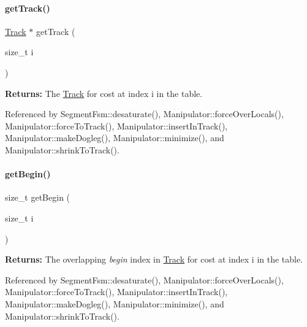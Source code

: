 \paragraph{\texorpdfstring{get\+Track()}{getTrack()}}
{\footnotesize\ttfamily \mbox{\hyperlink{classKite_1_1Track}{Track}} $\ast$ get\+Track (\begin{DoxyParamCaption}\item[{size\+\_\+t}]{i }\end{DoxyParamCaption})\hspace{0.3cm}{\ttfamily [inline]}}

{\bfseries Returns\+:} The \mbox{\hyperlink{classKite_1_1Track}{Track}} for cost at index {\ttfamily i} in the table. 

Referenced by Segment\+Fsm\+::desaturate(), Manipulator\+::force\+Over\+Locals(), Manipulator\+::force\+To\+Track(), Manipulator\+::insert\+In\+Track(), Manipulator\+::make\+Dogleg(), Manipulator\+::minimize(), and Manipulator\+::shrink\+To\+Track().

\mbox{\label{classKite_1_1SegmentFsm_a13a1ec8bdcf29f2bcb21cab348b77ed2}} 
\paragraph{\texorpdfstring{get\+Begin()}{getBegin()}}
{\footnotesize\ttfamily size\+\_\+t get\+Begin (\begin{DoxyParamCaption}\item[{size\+\_\+t}]{i }\end{DoxyParamCaption})\hspace{0.3cm}{\ttfamily [inline]}}

{\bfseries Returns\+:} The overlapping {\itshape begin} index in \mbox{\hyperlink{classKite_1_1Track}{Track}} for cost at index {\ttfamily i} in the table. 

Referenced by Segment\+Fsm\+::desaturate(), Manipulator\+::force\+Over\+Locals(), Manipulator\+::force\+To\+Track(), Manipulator\+::insert\+In\+Track(), Manipulator\+::make\+Dogleg(), Manipulator\+::minimize(), and Manipulator\+::shrink\+To\+Track().

\mbox{\label{classKite_1_1SegmentFsm_aaf31c0a3018908a2ee26a8ea9e893eb1}} 
